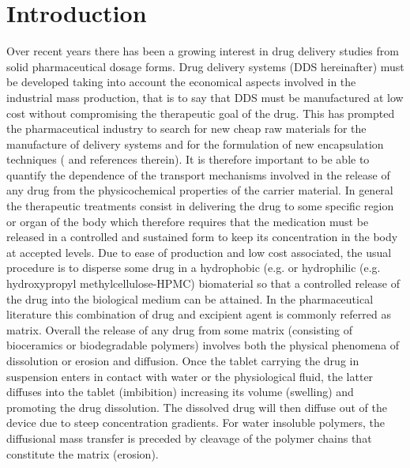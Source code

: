 \documentclass[superbib,unsortedaddress,preprint,byrevtex,aps,noshowpacs,titlepage]{revtex4}
\def\mytodo#1{$\clubsuit$\todo[noline]{$\clubsuit$\,\,\footnotesize #1}}
\begin{document}

\date{\today}


\maketitle

\section{\label{sec:intro} Introduction}

Over recent years there has been a growing interest in drug delivery
studies from solid pharmaceutical dosage forms.
Drug delivery systems (DDS hereinafter) must be developed taking into
account the economical aspects involved in the industrial mass
production, that is to say that DDS must be manufactured at low cost
without compromising the therapeutic goal of the drug. 
This has prompted the pharmaceutical industry to search for new cheap raw
materials for the manufacture of delivery systems and for the formulation
of new encapsulation techniques (\cite{Siepmann2001b} and references
therein).
It is therefore important to be able to quantify the dependence of the transport
mechanisms involved in the release of any drug from the physicochemical properties
of the carrier material.
In general the therapeutic treatments consist in delivering the drug to some specific
region or organ of the body which therefore requires that the medication must be released
in a controlled and sustained form to keep its concentration in the body at accepted levels.
Due to ease of production and low cost associated, the usual procedure is to disperse 
some drug in a hydrophobic (e.g.%
or hydrophilic (e.g.\, hydroxypropyl methylcellulose-HPMC) biomaterial so that a controlled release of the 
drug into the biological medium can be attained. 
In the pharmaceutical literature this combination of drug and excipient agent is commonly
referred as matrix.
Overall the release of any drug from some matrix (consisting of bioceramics or biodegradable polymers) 
involves both the physical phenomena of dissolution or erosion and diffusion. 
Once the tablet carrying the drug in suspension enters in contact with water or the physiological fluid,
 the latter diffuses into the tablet (imbibition) increasing its 
volume (swelling) and promoting the drug dissolution. 
The dissolved drug will then diffuse out of the device due to steep concentration gradients. 
For water insoluble polymers, the diffusional mass transfer is preceded by cleavage of the 
polymer chains that constitute the matrix (erosion). 
\end{document}
